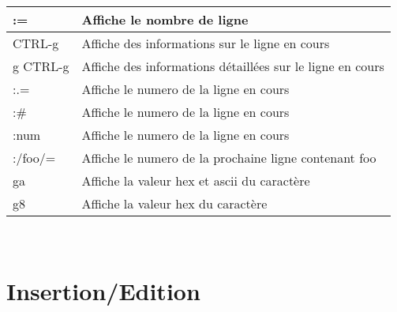 \documentclass{article}
\begin{document}
                            \begin{tabular}{|p{3cm}| l| }
                                \hline
                                := & Affiche le nombre de ligne\\ \hline
                                CTRL-g & Affiche des informations sur le ligne en cours\\ \hline
                                g CTRL-g & Affiche des informations détaillées sur le ligne en cours\\ \hline
                                :.= & Affiche le numero de la ligne en cours\\ \hline
                                :\# & Affiche le numero de la ligne en cours\\ \hline
                                :num & Affiche le numero de la ligne en cours\\ \hline
                                :/foo/= & Affiche le numero de la prochaine ligne contenant foo\\ \hline
                                ga & Affiche la valeur hex et ascii du caractère\\ \hline
                                g8 & Affiche la valeur hex du caractère\\ \hline
                            \end{tabular}\\

                            \section{Insertion/Edition}
\end{document}
